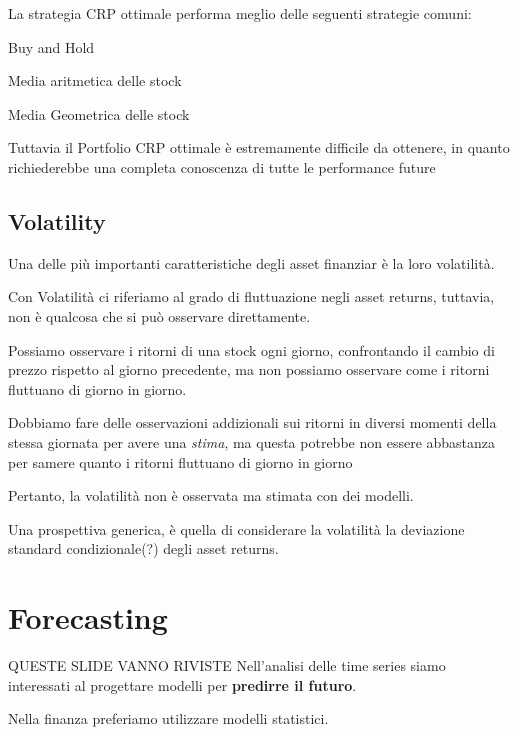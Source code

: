 \documentclass[a4paper,11pt]{report}
\begin{document}
{La strategia CRP ottimale performa meglio delle seguenti strategie comuni:
\begin{list}{}{}
\item Buy and Hold
\item Media aritmetica delle stock
\item Media Geometrica delle stock
\end{list}

Tuttavia il Portfolio CRP ottimale è estremamente difficile da ottenere, in quanto richiederebbe una completa conoscenza di tutte le performance future

\newpage


\section{Volatility}
	Una delle più importanti caratteristiche degli asset finanziar è la loro volatilità.
	
	Con Volatilità ci riferiamo al grado di fluttuazione negli asset returns, tuttavia, non è qualcosa che si può osservare direttamente.
	
	Possiamo osservare i ritorni di una stock ogni giorno, confrontando il cambio di prezzo rispetto al giorno precedente, ma non possiamo osservare come i ritorni fluttuano di giorno in giorno.
	
	Dobbiamo fare delle osservazioni addizionali sui ritorni in diversi momenti della stessa giornata per avere una \emph{stima}, ma questa potrebbe non essere abbastanza per samere quanto i ritorni fluttuano di giorno in giorno
	
	Pertanto, la volatilità non è osservata ma stimata con dei modelli.
	
	Una prospettiva generica, è quella di considerare la volatilità la deviazione standard condizionale(?) degli asset returns.


\newpage


\chapter{Forecasting}
	{\huge{QUESTE SLIDE VANNO RIVISTE}}
	Nell'analisi delle time series siamo interessati al progettare  modelli per \textbf{predirre il futuro}.
	
	Nella finanza preferiamo utilizzare modelli statistici.

}
\end{document}
